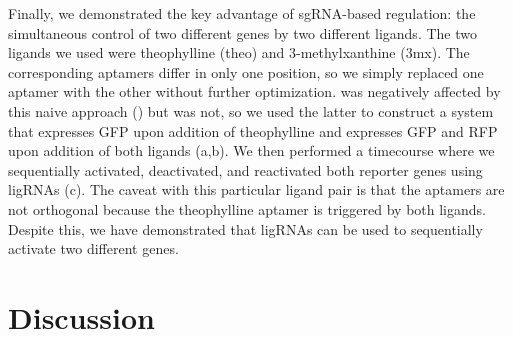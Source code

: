 \documentclass[10pt,oneside]{article}
\begin{document}
Finally, we demonstrated the key advantage of sgRNA-based regulation: the simultaneous control of two different genes by two different ligands. The two ligands we used were theophylline (theo) and 3-methylxanthine (3mx).  The corresponding aptamers differ in only one position, so we simply replaced one aptamer with the other without further optimization.  \ligrnaF was negatively affected by this naive approach () but \ligrnaB was not, so we used the latter to construct a system that expresses GFP upon addition of theophylline and expresses GFP and RFP upon addition of both ligands (a,b).  We then performed a timecourse where we sequentially activated, deactivated, and reactivated both reporter genes using ligRNAs (c).  The caveat with this particular ligand pair is that the aptamers are not orthogonal because the theophylline aptamer is triggered by both ligands.  Despite this, we have demonstrated that ligRNAs can be used to sequentially activate two different genes.



% 
% 
% 
% 
% 
%
% 
% 
% 
%

\section{Discussion}

\end{document}
